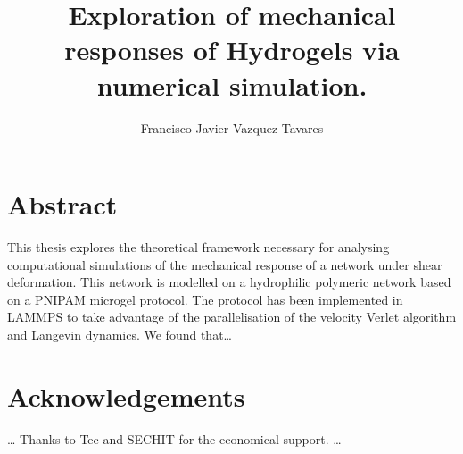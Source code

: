\documentclass[12pt,colorful,boxey]{tufte-style-thesis}
\author{Francisco Javier Vazquez Tavares}
\title{Exploration of mechanical responses of Hydrogels via numerical simulation.}
\begin{document}
\maketitle

\justifying

\chapter*{Abstract}
This thesis explores the theoretical framework necessary for analysing computational simulations of the mechanical response of a network under shear deformation.
This network is modelled on a hydrophilic polymeric network based on a PNIPAM microgel protocol.
The protocol has been implemented in LAMMPS to take advantage of the parallelisation of the velocity Verlet algorithm and Langevin dynamics.
We found that\ldots


\chapter*{Acknowledgements}
\ldots 
Thanks to Tec and SECHIT for the economical support.
\ldots

\tableofcontents
\listoffigures
\listoftables


\mainmatter



\citep{*}
\end{document}
